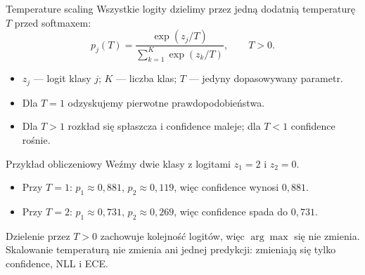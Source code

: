 \documentclass[aspectratio=169,professionalfonts,t]{beamer}
\begin{document}



\begin{frame}{}
\end{frame}

\begin{frame}{Temperature scaling}
  Wszystkie logity dzielimy przez jedną dodatnią temperaturę $T$ przed softmaxem:
  \[
  p_j(T)=\frac{\exp(z_j/T)}{\sum_{k=1}^{K}\exp(z_k/T)},\qquad T>0.
  \]
  \begin{itemize}
    \item $z_j$ — logit klasy $j$; $K$ — liczba klas; $T$ — jedyny dopasowywany parametr.
    \item Dla $T=1$ odzyskujemy pierwotne prawdopodobieństwa.
    \item Dla $T>1$ rozkład się spłaszcza i confidence maleje; dla $T<1$ confidence rośnie.
  \end{itemize}
\end{frame}

\begin{frame}{Przykład obliczeniowy}
  Weźmy dwie klasy z logitami $z_1=2$ i $z_2=0$.
  \begin{itemize}
    \item Przy $T=1$: $p_1\approx0{,}881$, $p_2\approx0{,}119$, więc confidence wynosi $0{,}881$.
    \item Przy $T=2$: $p_1\approx0{,}731$, $p_2\approx0{,}269$, więc confidence spada do $0{,}731$.
  \end{itemize}
  Dzielenie przez $T>0$ zachowuje kolejność logitów, więc $\arg\max$ się nie zmienia.
  Skalowanie temperaturą nie zmienia ani jednej predykcji: zmieniają się tylko confidence, NLL i ECE.
\end{frame}
\end{document}
